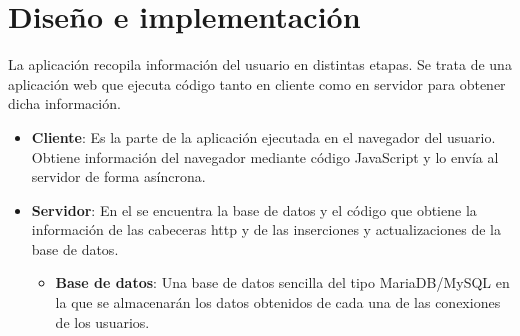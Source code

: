\chapter{Diseño e implementación}
\noindent
La aplicación recopila información del usuario en distintas etapas. Se trata de una aplicación web que ejecuta código tanto en cliente como en servidor para obtener dicha información.
\begin{itemize}
    \item \textbf{Cliente}: Es la parte de la aplicación ejecutada en el navegador del usuario. Obtiene información del navegador mediante código JavaScript y lo envía al servidor de forma asíncrona.
    \item \textbf{Servidor}: En el se encuentra la base de datos y el código que obtiene la información de las cabeceras http y de las inserciones y actualizaciones de la base de datos.
     \begin{itemize}
         \item \textbf{Base de datos}: Una base de datos sencilla del tipo MariaDB/MySQL en la que se almacenarán los datos obtenidos de cada una de las conexiones de los usuarios.
     \end{itemize}
\end{itemize}
